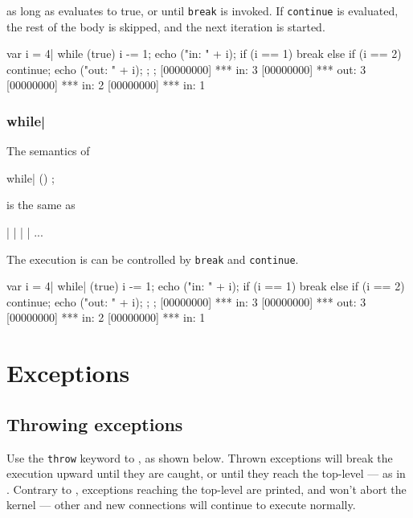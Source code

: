 \noindent
as long as  evaluates to true, or until \lstinline|break| is
invoked.  If \lstinline|continue| is evaluated, the rest of the body
is skipped, and the next iteration is started.

\begin{urbiscript}[firstnumber=last]
{
  var i = 4|
  while (true)
  {
    i -= 1;
    echo ("in: " + i);
    if (i == 1)
      break
    else if (i == 2)
      continue;
    echo ("out: " + i);
  };
};
[00000000] *** in: 3
[00000000] *** out: 3
[00000000] *** in: 2
[00000000] *** in: 1
\end{urbiscript}


\subsubsection{while|}

The semantics of

\begin{urbiunchecked}[frame=, backgroundcolor=, ]
while| ()
  ;
\end{urbiunchecked}

\noindent
is the same as

\begin{urbiunchecked}[frame=, backgroundcolor=, ]
 |  |  |  | ...
\end{urbiunchecked}

The execution is can be controlled by \lstinline|break| and
\lstinline|continue|.

\begin{urbiscript}[firstnumber=last]
{
  var i = 4|
  while| (true)
  {
    i -= 1;
    echo ("in: " + i);
    if (i == 1)
      break
    else if (i == 2)
      continue;
    echo ("out: " + i);
  };
};
[00000000] *** in: 3
[00000000] *** out: 3
[00000000] *** in: 2
[00000000] *** in: 1
\end{urbiscript}


\section{Exceptions}
\label{sec:lang:except}
\subsection{Throwing exceptions}

Use the \lstinline|throw| keyword to , as shown below. Thrown exceptions will
break the execution upward until they are caught, or until they reach
the top-level --- as in \Cxx.  Contrary to \Cxx, exceptions reaching
the top-level are printed, and won't abort the kernel --- other and new
connections will continue to execute normally.

